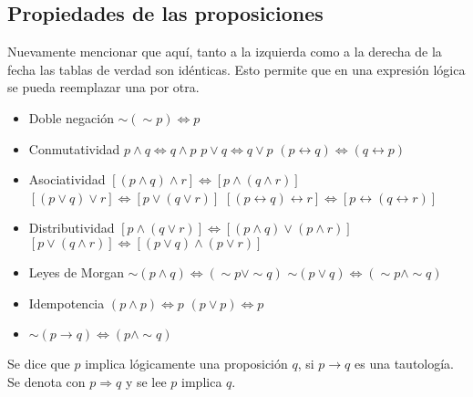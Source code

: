 \subsection{Propiedades de las proposiciones}
Nuevamente mencionar que aquí, tanto a la izquierda como a la derecha de la fecha las tablas de verdad son idénticas. Esto permite que en una expresión lógica se pueda reemplazar una por otra.
\begin{itemize}
	\item Doble negación
		\subitem $\sim(\sim p)\Leftrightarrow p$
	\item Conmutatividad
		\subitem $p\wedge q\Leftrightarrow q\wedge p$
		\subitem $p\vee q\Leftrightarrow q\vee p$
		\subitem $(p\longleftrightarrow q)\Leftrightarrow(q\longleftrightarrow p)$
	\item Asociatividad
		\subitem $[(p\wedge q)\wedge r]\Leftrightarrow[p\wedge(q\wedge r)]$
		\subitem $[(p\vee q)\vee r]\Leftrightarrow[p\vee(q\vee r)]$
		\subitem $[(p\longleftrightarrow q)\longleftrightarrow r]\Leftrightarrow[p\longleftrightarrow(q\longleftrightarrow r)]$
	\item  Distributividad
		\subitem $[p\wedge(q\vee r)]\Leftrightarrow[(p\wedge q)\vee(p\wedge r)]$
		\subitem $[p\vee(q\wedge r)]\Leftrightarrow[(p\vee q)\wedge(p\vee r)]$
	\item Leyes de Morgan
		\subitem $\sim(p\wedge q) \Leftrightarrow (\sim p\vee\sim q)$
		\subitem $\sim(p\vee q)\Leftrightarrow(\sim p\wedge\sim q)$
	\item Idempotencia
		\subitem $(p\wedge p)\Leftrightarrow p$
		\subitem $(p\vee p)\Leftrightarrow p$
	\item $\sim(p\longrightarrow q)\Leftrightarrow (p\wedge\sim q)$
\end{itemize}
Se dice que $p$ implica lógicamente una proposición $q$, si $p\longrightarrow q$ es una tautología. Se denota con $p\Rightarrow q$ y se lee $p$ implica $q$.\\